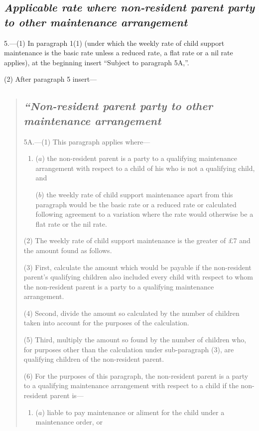\documentclass[12pt,a4paper]{article}
\begin{document}
{\subsection*{\itshape\sloppy Applicable rate where non-resident parent party to other maintenance arrangement}

5.---(1) In paragraph 1(1) (under which the weekly rate of child support maintenance is the basic rate unless a reduced rate, a flat rate or a nil rate applies), at the beginning insert “Subject to paragraph 5A,”.

(2) After paragraph 5 insert—
\begin{quotation}
\subsection*{\itshape “Non-resident parent party to other maintenance arrangement}

5A.---(1) This paragraph applies where—
\begin{enumerate}\item[]
($a$) the non-resident parent is a party to a qualifying maintenance arrangement with respect to a child of his who is not a qualifying child, and

($b$) the weekly rate of child support maintenance apart from this paragraph would be the basic rate or a reduced rate or calculated following agreement to a variation where the rate would otherwise be a flat rate or the nil rate.
\end{enumerate}

(2) The weekly rate of child support maintenance is the greater of £7 and the amount found as follows.

(3) First, calculate the amount which would be payable if the non-resident parent's qualifying children also included every child with respect to whom the non-resident parent is a party to a qualifying maintenance arrangement.

(4) Second, divide the amount so calculated by the number of children taken into account for the purposes of the calculation.

(5) Third, multiply the amount so found by the number of children who, for purposes other than the calculation under sub-\hspace{0pt}paragraph (3), are qualifying children of the non-resident parent.

(6) For the purposes of this paragraph, the non-resident parent is a party to a qualifying maintenance arrangement with respect to a child if the non-resident parent is—
\begin{enumerate}\item[]
($a$) liable to pay maintenance or aliment for the child under a maintenance order, or


\end{enumerate}
\end{quotation}}
\end{document}
